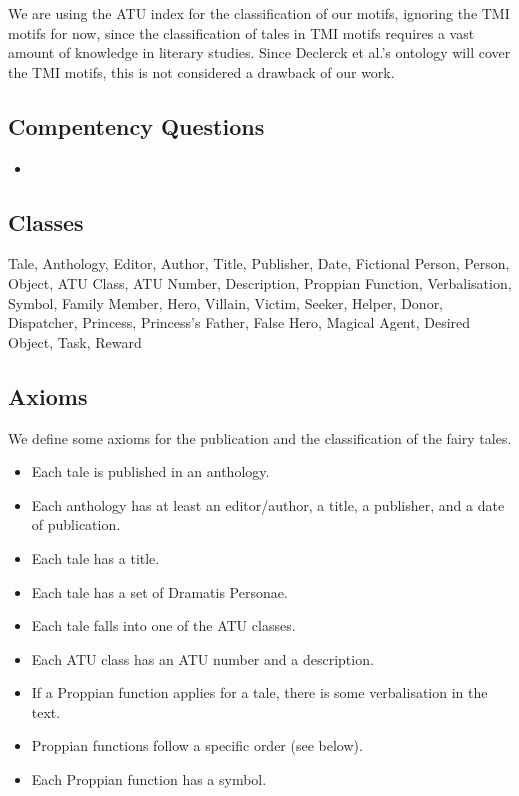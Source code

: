 \documentclass[10pt,a4paper]{article}
\begin{document}
We are using the ATU index for the classification of our motifs, ignoring the TMI motifs for now, since the classification of tales in TMI motifs requires a vast amount of  knowledge in literary studies. Since Declerck et al.'s ontology will cover the TMI motifs, this is not considered a drawback of our work. 

	 \subsection{Compentency Questions}
	 	\begin{itemize}
			\item
		\end{itemize}

	\subsection{Classes}
	\small 
Tale, Anthology, Editor, Author, Title, Publisher, Date, Fictional Person, Person, Object, ATU Class, ATU Number, Description, Proppian Function, Verbalisation, Symbol, Family Member, Hero, Villain, Victim, Seeker, Helper, Donor, Dispatcher, Princess, Princess's Father, False Hero, Magical Agent, Desired Object, Task, Reward 

	\subsection{Axioms}
	
We define some axioms for the publication and the classification of the fairy tales. 
	\small 

\begin{itemize}
		\item Each tale is published in an anthology. 
		\item Each anthology has at least an editor/author, a title, a publisher, and a date of publication.
		\item Each tale has a title. 
		\item Each tale has a set of Dramatis Personae. 
		\item Each tale falls into one of the ATU classes. 
		\item Each ATU class has an ATU number and a description. 
		\item If a Proppian function applies for a tale, there is some verbalisation in the text. 
		\item Proppian functions follow a specific order (see below).
		\item Each Proppian function has a symbol.
\end{itemize}
		
\end{document}
